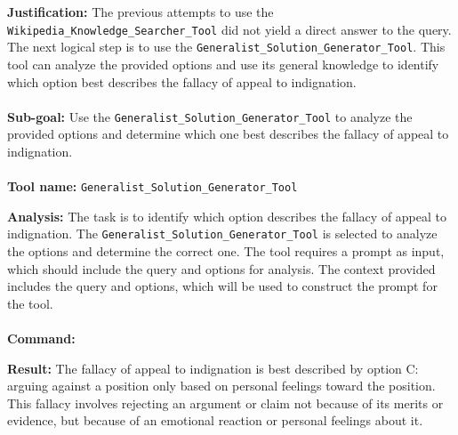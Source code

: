 \begin{plannerbox}

\textbf{Justification:}
The previous attempts to use the \texttt{Wikipedia\_Knowledge\_Searcher\_Tool} did not yield a direct answer to the query. The next logical step is to use the \texttt{Generalist\_Solution\_Generator\_Tool}. This tool can analyze the provided options and use its general knowledge to identify which option best describes the fallacy of appeal to indignation.
\\\\
\textbf{Sub-goal:}
Use the \texttt{Generalist\_Solution\_Generator\_Tool} to analyze the provided options and determine which one best describes the fallacy of appeal to indignation.
\\\\
\textbf{Tool name:} \texttt{Generalist\_Solution\_Generator\_Tool}
\end{plannerbox}


\begin{executorbox}

\textbf{Analysis:}
The task is to identify which option describes the fallacy of appeal to indignation. The \texttt{Generalist\_Solution\_Generator\_Tool} is selected to analyze the options and determine the correct one. The tool requires a prompt as input, which should include the query and options for analysis. The context provided includes the query and options, which will be used to construct the prompt for the tool.
\\\\
\textbf{Command:}
\end{executorbox}


\begin{executorbox}
\textbf{Result:} The fallacy of appeal to indignation is best described by option C: arguing against a position only based on personal feelings toward the position. This fallacy involves rejecting an argument or claim not because of its merits or evidence, but because of an emotional reaction or personal feelings about it.
\end{executorbox}


